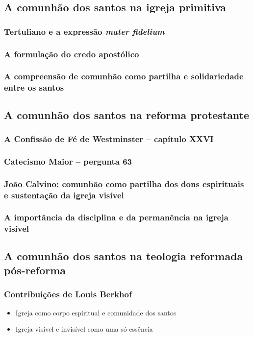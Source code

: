 \subsection{A comunhão dos santos na igreja primitiva}
\subsubsection*{Tertuliano e a expressão \textit{mater fidelium}}
\subsubsection*{A formulação do credo apostólico}
\subsubsection*{A compreensão de comunhão como partilha e solidariedade entre os santos}

\subsection{A comunhão dos santos na reforma protestante}
\subsubsection*{A Confissão de Fé de Westminster -- capítulo XXVI}
\subsubsection*{Catecismo Maior -- pergunta 63}
\subsubsection*{João Calvino: comunhão como partilha dos dons espirituais e sustentação da igreja visível}
\subsubsection*{A importância da disciplina e da permanência na igreja visível}

\subsection{A comunhão dos santos na teologia reformada pós-reforma}
\subsubsection{Contribuições de Louis Berkhof}
\begin{itemize}
  \item Igreja como corpo espiritual e comunidade dos santos
  \item Igreja visível e invisível como uma só essência
\end{itemize}

